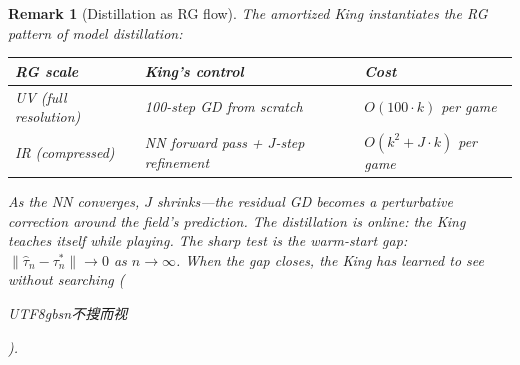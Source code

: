 \documentclass[11pt,a4paper]{article}
\newtheorem{remark}[theorem]{Remark}
\begin{document}
\begin{remark}[Distillation as RG flow]%
\label{rem:rg-distillation}
\color{black!60}%
The amortized King instantiates the RG pattern of
model distillation:
\begin{center}
\small
\begin{tabular}{@{}lll@{}}
\toprule
\textbf{RG scale} & \textbf{King's control} & \textbf{Cost} \\
\midrule
UV (full resolution) &
  100-step GD from scratch &
  $O(100 \cdot k)$ per game \\
IR (compressed) &
  NN forward pass + $J$-step refinement &
  $O(k^2 + J \cdot k)$ per game \\
\bottomrule
\end{tabular}
\end{center}
As the NN converges, $J$ shrinks---the
residual GD becomes a perturbative correction around
the field's prediction.
The distillation is \emph{online}: the King teaches
itself while playing.
The sharp test is the \emph{warm-start gap}:
$\|\hat{\tau}_n - \tau^*_n\| \to 0$ as $n \to \infty$.
When the gap closes, the King has learned to see
without searching
(\begin{CJK}{UTF8}{gbsn}不搜而视\end{CJK}).
\end{remark}
\end{document}
